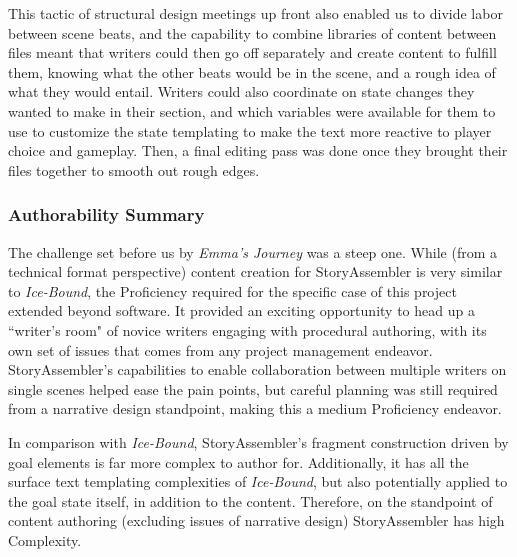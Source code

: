 This tactic of structural design meetings up front also enabled us to divide labor between scene beats, and the capability to combine libraries of content between files meant that writers could then go off separately and create content to fulfill them, knowing what the other beats would be in the scene, and a rough idea of what they would entail. Writers could also coordinate on state changes they wanted to make in their section, and which variables were available for them to use to customize the state templating to make the text more reactive to player choice and gameplay. Then, a final editing pass was done once they brought their files together to smooth out rough edges.

\subsubsection{Authorability Summary}

The challenge set before us by \textit{Emma's Journey} was a steep one. While (from a technical format perspective) content creation for StoryAssembler is very similar to \textit{Ice-Bound}, the Proficiency required for the specific case of this project extended beyond software. It provided an exciting opportunity to head up a ``writer's room" of novice writers engaging with procedural authoring, with its own set of issues that comes from any project management endeavor. StoryAssembler's capabilities to enable collaboration between multiple writers on single scenes helped ease the pain points, but careful planning was still required from a narrative design standpoint, making this a medium Proficiency endeavor.

In comparison with \textit{Ice-Bound}, StoryAssembler's fragment construction driven by goal elements is far more complex to author for. Additionally, it has all the surface text templating complexities of \textit{Ice-Bound}, but also potentially applied to the goal state itself, in addition to the content. Therefore, on the standpoint of content authoring (excluding issues of narrative design) StoryAssembler has high Complexity.

